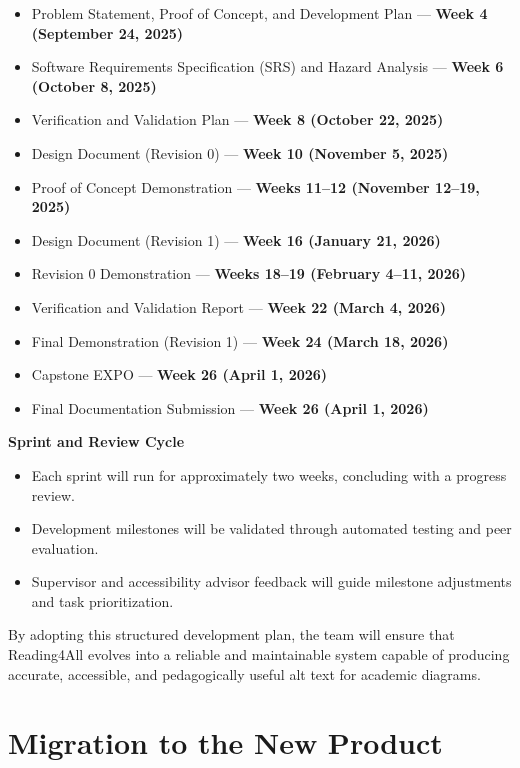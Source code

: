 \documentclass[12pt]{article}
\begin{document}
\begin{itemize}
  \item Problem Statement, Proof of Concept, and Development Plan —
    \textbf{Week 4 (September 24, 2025)}
  \item Software Requirements Specification (SRS) and Hazard Analysis
    — \textbf{Week 6 (October 8, 2025)}
  \item Verification and Validation Plan — \textbf{Week 8 (October 22, 2025)}
  \item Design Document (Revision 0) — \textbf{Week 10 (November 5, 2025)}
  \item Proof of Concept Demonstration — \textbf{Weeks 11–12
    (November 12–19, 2025)}
  \item Design Document (Revision 1) — \textbf{Week 16 (January 21, 2026)}
  \item Revision 0 Demonstration — \textbf{Weeks 18–19 (February 4–11, 2026)}
  \item Verification and Validation Report — \textbf{Week 22 (March 4, 2026)}
  \item Final Demonstration (Revision 1) — \textbf{Week 24 (March 18, 2026)}
  \item Capstone EXPO — \textbf{Week 26 (April 1, 2026)}
  \item Final Documentation Submission — \textbf{Week 26 (April 1, 2026)}
\end{itemize}

\textbf{Sprint and Review Cycle}
\begin{itemize}
  \item Each sprint will run for approximately two weeks, concluding
    with a progress review.
  \item Development milestones will be validated through automated
    testing and peer evaluation.
  \item Supervisor and accessibility advisor feedback will guide
    milestone adjustments and task prioritization.
\end{itemize}

By adopting this structured development plan, the team will ensure
that Reading4All evolves into a reliable and maintainable system
capable of producing accurate, accessible, and pedagogically useful
alt text for academic diagrams.

\section{Migration to the New Product}
\end{document}
